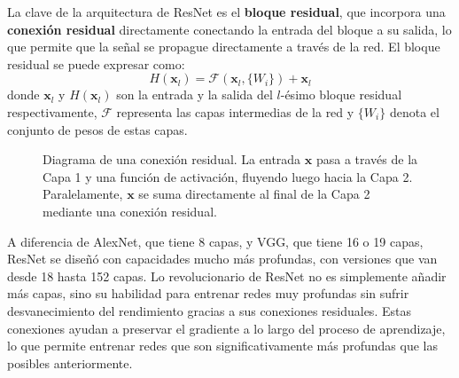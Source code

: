 La clave de la arquitectura de ResNet es el \textbf{bloque residual}, que incorpora una \textbf{conexión residual} directamente conectando la entrada del bloque a su salida, lo que permite que la señal se propague directamente a través de la red. El bloque residual se puede expresar como:
\begin{equation}
	H(\mathbf{x}_l) = \mathcal{F}(\mathbf{x}_l, \{W_i\}) + \mathbf{x}_l
\end{equation}
donde \(\mathbf{x}_l\) y \(H(\mathbf{x}_l)\) son la entrada y la salida del $l$-ésimo bloque residual respectivamente, \(\mathcal{F}\) representa las capas intermedias de la red y \(\{W_i\}\) denota el conjunto de pesos de estas capas.

\begin{figure}
	\centering
{}
\caption{Diagrama de una conexión residual. La entrada $\mathbf{x}$ pasa a través de la Capa 1 y una función de activación, fluyendo luego hacia la Capa 2. Paralelamente, $\mathbf{x}$ se suma directamente al final de la Capa 2 mediante una conexión residual. }
\end{figure}

A diferencia de AlexNet, que tiene 8 capas, y VGG, que tiene 16 o 19 capas, ResNet se diseñó con capacidades mucho más profundas, con versiones que van desde 18 hasta 152 capas. Lo revolucionario de ResNet no es simplemente añadir más capas, sino su habilidad para entrenar redes muy profundas sin sufrir desvanecimiento del rendimiento gracias a sus conexiones residuales. Estas conexiones ayudan a preservar el gradiente a lo largo del proceso de aprendizaje, lo que permite entrenar redes que son significativamente más profundas que las posibles anteriormente.

